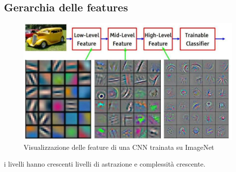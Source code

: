 \subsection{Gerarchia delle features}
\begin{figure}[!h]
    \includegraphics[scale=.45]{images/cnn/features_hierarchy01.png}
    \caption{Visualizzazione delle feature di una CNN trainata su ImageNet}
    \centering
\end{figure}


i livelli hanno crescenti livelli di astrazione e complessità crescente.



